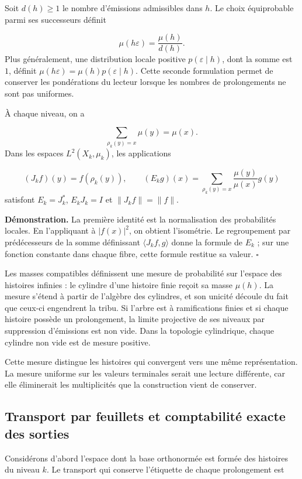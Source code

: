 Soit \(d(h)\geq1\) le nombre d’émissions admissibles dans \(h\). Le choix équiprobable parmi ses successeurs définit

\[
\mu(h\varepsilon)=\frac{\mu(h)}{d(h)}.
\]
Plus généralement, une distribution locale positive \(p(\varepsilon\mid h)\), dont la somme est \(1\), définit \(\mu(h\varepsilon)=\mu(h)p(\varepsilon\mid h)\). Cette seconde formulation permet de conserver les pondérations du lecteur lorsque les nombres de prolongements ne sont pas uniformes.

À chaque niveau, on a

\[
\sum_{\rho_k(y)=x}\mu(y)=\mu(x).
\]
Dans les espaces \(L^2(X_k,\mu_k)\), les applications

\[
(J_kf)(y)=f(\rho_k(y)),
\qquad
(E_kg)(x)=\sum_{\rho_k(y)=x}\frac{\mu(y)}{\mu(x)}g(y)
\]
satisfont \(E_k=J_k^*\), \(E_kJ_k=I\) et \(\|J_kf\|=\|f\|\).

\textbf{Démonstration.} La première identité est la normalisation des probabilités locales. En l'appliquant à \(|f(x)|^2\), on obtient l'isométrie. Le regroupement par prédécesseurs de la somme définissant \(\langle J_kf,g\rangle\) donne la formule de \(E_k\) ; sur une fonction constante dans chaque fibre, cette formule restitue sa valeur. \hfill\(\square\)

Les masses compatibles définissent une mesure de probabilité sur l’espace des histoires infinies : le cylindre d’une histoire finie reçoit sa masse \(\mu(h)\). La mesure s’étend à partir de l’algèbre des cylindres, et son unicité découle du fait que ceux-ci engendrent la tribu. Si l’arbre est à ramifications finies et si chaque histoire possède un prolongement, la limite projective de ses niveaux par suppression d’émissions est non vide. Dans la topologie cylindrique, chaque cylindre non vide est de mesure positive.

Cette mesure distingue les histoires qui convergent vers une même représentation. La mesure uniforme sur les valeurs terminales serait une lecture différente, car elle éliminerait les multiplicités que la construction vient de conserver.

\subsection{Transport par feuillets et comptabilité exacte des sorties}
Considérons d'abord l'espace dont la base orthonormée est formée des histoires du niveau \(k\). Le transport qui conserve l'étiquette de chaque prolongement est

